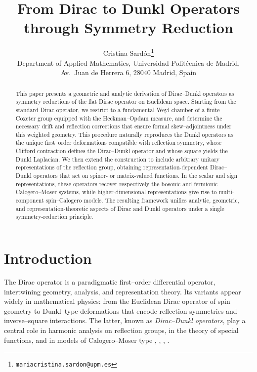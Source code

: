 \documentclass[12pt]{article}
\title{\textbf{From Dirac to Dunkl Operators through Symmetry Reduction}}
\author{
Cristina Sardón\thanks{\texttt{mariacristina.sardon@upm.es}} \\
Department of Applied Mathematics, Universidad Politécnica de Madrid, \\
Av.~Juan de Herrera 6, 28040 Madrid, Spain
}
\date{} %
\newcommand{\1}{\mathbbm{1}}
\theoremstyle{definition}
\begin{document}
\maketitle

\begin{abstract}

This paper presents a geometric and analytic derivation of Dirac–Dunkl operators as symmetry reductions of the flat Dirac operator on Euclidean space. Starting from the standard Dirac operator, we restrict to a fundamental Weyl chamber of a finite Coxeter group equipped with the Heckman–Opdam measure, and determine the necessary drift and reflection corrections that ensure formal skew–adjointness under this weighted geometry. This procedure naturally reproduces the Dunkl operators as the unique first–order deformations compatible with reflection symmetry, whose Clifford contraction defines the Dirac–Dunkl operator and whose square yields the Dunkl Laplacian. We then extend the construction to include arbitrary unitary representations of the reflection group, obtaining representation-dependent Dirac–Dunkl operators that act on spinor- or matrix-valued functions. In the scalar and sign representations, these operators recover respectively the bosonic and fermionic Calogero–Moser systems, while higher-dimensional representations give rise to multi-component spin–Calogero models. The resulting framework unifies analytic, geometric, and representation-theoretic aspects of Dirac and Dunkl operators under a single symmetry-reduction principle.

\end{abstract}

	



\section{Introduction}

The Dirac operator is a paradigmatic first--order differential operator, intertwining
geometry, analysis, and representation theory. Its variants appear widely in mathematical
physics: from the Euclidean Dirac operator of spin geometry to Dunkl--type deformations
that encode reflection symmetries and inverse--square interactions. The latter, known as
\emph{Dirac--Dunkl operators}, play a central role in harmonic analysis on reflection groups,
in the theory of special functions, and in models of Calogero--Moser type \cite{Wadati1993}, \cite{Moser1975}, \cite{Calogero1971}, \cite{pere}.
\end{document}
